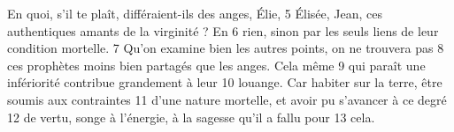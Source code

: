En quoi, s'il te plaît, différaient-ils des anges, Élie,	 
5	 	Élisée, Jean, ces authentiques amants de la virginité ? En	 
6	 	rien, sinon par les seuls liens de leur condition mortelle.	 
7	 	Qu'on examine bien les autres points, on ne trouvera pas	 
8	 	ces prophètes moins bien partagés que les anges. Cela même	 
9	 	qui paraît une infériorité contribue grandement à leur	 
10	 	louange. Car habiter sur la terre, être soumis aux contraintes	 
11	 	d'une nature mortelle, et avoir pu s'avancer à ce degré	 
12	 	de vertu, songe à l'énergie, à la sagesse qu'il a fallu pour	 
13	 	cela.
